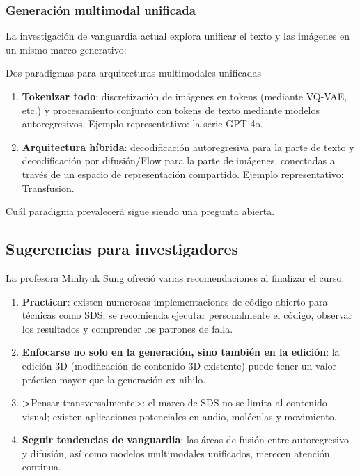 \documentclass[a4paper]{article}
\begin{document}
\subsubsection{Generación multimodal unificada}

La investigación de vanguardia actual explora unificar el texto y las imágenes en un mismo marco generativo:

\begin{knowledgebox}{Dos paradigmas para arquitecturas multimodales unificadas}
\begin{enumerate}
    \item \textbf{Tokenizar todo}: discretización de imágenes en tokens (mediante VQ-VAE, etc.) y procesamiento conjunto con tokens de texto mediante modelos autoregresivos. Ejemplo representativo: la serie GPT-4o.
    \item \textbf{Arquitectura híbrida}: decodificación autoregresiva para la parte de texto y decodificación por difusión/Flow para la parte de imágenes, conectadas a través de un espacio de representación compartido. Ejemplo representativo: Transfusion.
\end{enumerate}

Cuál paradigma prevalecerá sigue siendo una pregunta abierta.
\end{knowledgebox}

\subsection{Sugerencias para investigadores}

La profesora Minhyuk Sung ofreció varias recomendaciones al finalizar el curso:

\begin{enumerate}
    \item \textbf{Practicar}: existen numerosas implementaciones de código abierto para técnicas como SDS; se recomienda ejecutar personalmente el código, observar los resultados y comprender los patrones de falla.
    \item \textbf{Enfocarse no solo en la generación, sino también en la edición}: la edición 3D (modificación de contenido 3D existente) puede tener un valor práctico mayor que la generación ex nihilo.
    \item \textbf>Pensar transversalmente>: el marco de SDS no se limita al contenido visual; existen aplicaciones potenciales en audio, moléculas y movimiento.
    \item \textbf{Seguir tendencias de vanguardia}: las áreas de fusión entre autoregresivo y difusión, así como modelos multimodales unificados, merecen atención continua.
\end{enumerate}
\end{document}

